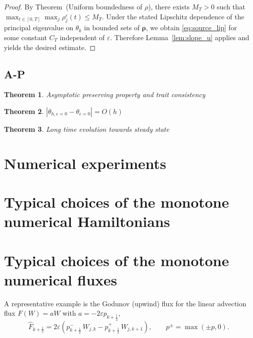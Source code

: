 \documentclass[11pt, dina4, amsfont12]{article}
\newtheorem{theorem}{Theorem}[section]
\begin{document}
\begin{proof}
By Theorem~(Uniform boundedness of $\rho$), there exists $M_T>0$ such that
$\max_{t\in[0,T]}\max_j \rho_j^\varepsilon(t)\le M_T$.
Under the stated Lipschitz dependence of the principal eigenvalue on $\theta_k$
in bounded sets of $\boldsymbol\rho$, we obtain \eqref{eq:source_lip} for some
constant $C_T$ independent of $\varepsilon$.
Therefore Lemma~\ref{lem:slope_u} applies and yields the desired estimate.
\end{proof}




\subsection{A-P}

\begin{theorem}
    Asymptotic preserving property and trait consistency
\end{theorem}

\begin{theorem}
    $|\theta_{h,\epsilon=0}-\theta_{\epsilon=0}| = O(h)$ 
\end{theorem}

\begin{theorem}
    Long time evolution towards steady state
\end{theorem}


\section{Numerical experiments}

\appendix
\section{Typical choices of the monotone numerical Hamiltonians} \label{append:HJ}

\section{Typical choices of the monotone numerical fluxes} \label{append:flux}
A representative example is the Godunov (upwind) flux for the linear advection
flux $F(W)=aW$ with $a=-2\varepsilon p_{k+\frac12}$,
\[
\widehat F_{k+\frac12}
=
2\varepsilon\!\left(
p_{k+\frac12}^-\, W_{j,k}
-
p_{k+\frac12}^+\, W_{j,k+1}
\right),
\qquad
p^\pm=\max(\pm p,0).
\]
\end{document}
